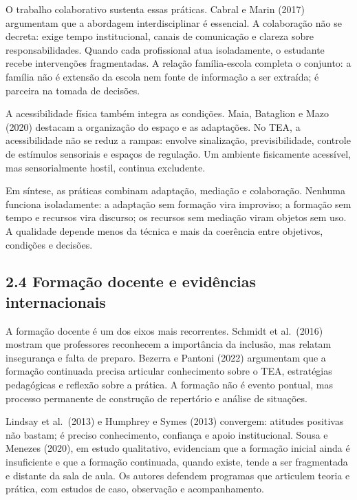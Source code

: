 O trabalho colaborativo sustenta essas práticas. Cabral e Marin (2017)
argumentam que a abordagem interdisciplinar é essencial. A colaboração
não se decreta: exige tempo institucional, canais de comunicação e
clareza sobre responsabilidades. Quando cada profissional atua
isoladamente, o estudante recebe intervenções fragmentadas. A relação
família-escola completa o conjunto: a família não é extensão da escola
nem fonte de informação a ser extraída; é parceira na tomada de
decisões.

A acessibilidade física também integra as condições. Maia, Bataglion e
Mazo (2020) destacam a organização do espaço e as adaptações. No TEA, a
acessibilidade não se reduz a rampas: envolve sinalização,
previsibilidade, controle de estímulos sensoriais e espaços de
regulação. Um ambiente fisicamente acessível, mas sensorialmente hostil,
continua excludente.

Em síntese, as práticas combinam adaptação, mediação e colaboração.
Nenhuma funciona isoladamente: a adaptação sem formação vira improviso;
a formação sem tempo e recursos vira discurso; os recursos sem mediação
viram objetos sem uso. A qualidade depende menos da técnica e mais da
coerência entre objetivos, condições e decisões.

\subsection{2.4 Formação docente e evidências
internacionais}\label{formauxe7uxe3o-docente-e-eviduxeancias-internacionais}

A formação docente é um dos eixos mais recorrentes. Schmidt et
al.~(2016) mostram que professores reconhecem a importância da inclusão,
mas relatam insegurança e falta de preparo. Bezerra e Pantoni (2022)
argumentam que a formação continuada precisa articular conhecimento
sobre o TEA, estratégias pedagógicas e reflexão sobre a prática. A
formação não é evento pontual, mas processo permanente de construção de
repertório e análise de situações.

Lindsay et al.~(2013) e Humphrey e Symes (2013) convergem: atitudes
positivas não bastam; é preciso conhecimento, confiança e apoio
institucional. Sousa e Menezes (2020), em estudo qualitativo, evidenciam
que a formação inicial ainda é insuficiente e que a formação continuada,
quando existe, tende a ser fragmentada e distante da sala de aula. Os
autores defendem programas que articulem teoria e prática, com estudos
de caso, observação e acompanhamento.

